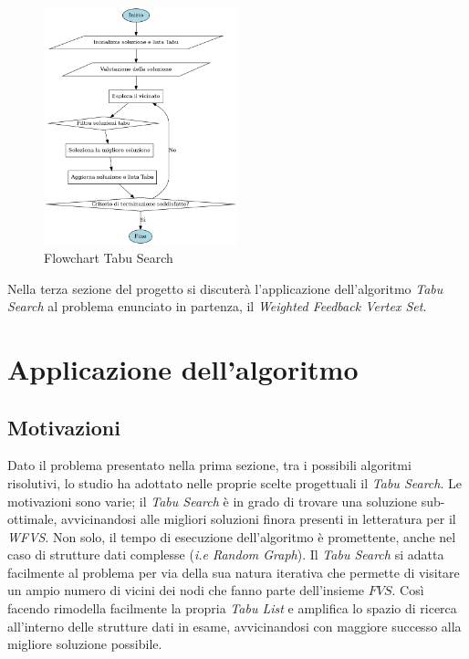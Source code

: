 \documentclass[a4paper, 10pt]{article}
\begin{document}
\begin{figure}[H]
    \centering
    \includegraphics[width=0.50\textwidth]{./img/tabu_search_flowchart.png}
    \caption{Flowchart Tabu Search}
    \label{fig:tabu_search}
\end{figure}

\noindent
Nella terza sezione del progetto si discuterà l'applicazione dell'algoritmo \textit{Tabu Search} al problema enunciato in partenza, il \textit{Weighted Feedback Vertex Set}.

\section{Applicazione dell'algoritmo}\label{s:3}
\subsection{Motivazioni}
Dato il problema presentato nella prima sezione, tra i possibili algoritmi risolutivi, lo studio ha adottato nelle proprie scelte progettuali il \textit{Tabu Search}. Le motivazioni sono varie; il \textit{Tabu Search} è in grado di trovare una soluzione sub-ottimale, avvicinandosi alle migliori soluzioni finora presenti in letteratura per il \textit{WFVS}. Non solo, il tempo di esecuzione dell'algoritmo è promettente, anche nel caso di strutture dati complesse (\textit{i.e Random Graph}). Il \textit{Tabu Search} si adatta facilmente al problema per via della sua natura iterativa che permette di visitare un ampio numero di vicini dei nodi che fanno parte dell'insieme $FVS$. Così facendo rimodella facilmente la propria \textit{Tabu List} e amplifica lo spazio di ricerca all'interno delle strutture dati in esame, avvicinandosi con maggiore successo alla migliore soluzione possibile.
\end{document}
